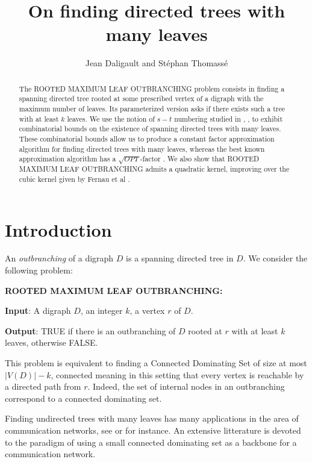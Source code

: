 \documentclass{article}
\title{On finding directed trees with many leaves}
\author{Jean Daligault and St\'ephan Thomass\'e}
\def\RMO{R{\footnotesize{OOTED}} M{\footnotesize{AXIMUM}} L{\footnotesize{EAF}} O{\footnotesize{UTBRANCHING}} }
\def\RMOC{R{\footnotesize{OOTED}} M{\footnotesize{AXIMUM}} L{\footnotesize{EAF}} O{\footnotesize{UTBRANCHING}}: }
\begin{document}
\maketitle

\begin{abstract}
The \RMO problem consists in finding a spanning directed tree rooted at some prescribed vertex of a 
digraph with the maximum number of leaves. Its parameterized version asks if there 
exists such a tree with at least $k$ leaves. We use the notion of $s-t$ numbering studied in \cite{stnum}, \cite{stnumdir}, \cite{LLWemb} to exhibit combinatorial bounds on the existence of spanning directed trees with many leaves. These combinatorial bounds allow us to produce a constant factor approximation algorithm for finding directed trees with many leaves, whereas the best known approximation algorithm has a $\sqrt{OPT}$-factor \cite{DrescherMaxLeaf}. We also show that \RMO admits a quadratic kernel, improving over the cubic kernel given by Fernau et al \cite{FernauMaxLeaf}.
\end{abstract}


\section{Introduction}
An \emph{outbranching} of a digraph $D$ is a spanning directed tree in $D$. 
We consider the following problem:

\vspace{12pt}
{\bf \RMOC}


\vspace{12pt}
\textbf{Input}: A digraph $D$, an integer $k$, a vertex $r$ of $D$.


\textbf{Output}: TRUE if there is an outbranching of $D$ rooted at $r$ with at least $k$ leaves, otherwise FALSE.
\vspace{12pt}

This problem is equivalent to finding a Connected Dominating Set of size at most $|V(D)|-k$, connected meaning in this setting that every vertex is reachable by a directed path from $r$. Indeed, the set of internal nodes in an outbranching correspond to a connected dominating set.

Finding undirected trees with many leaves has many applications in the area of communication networks, see \cite{MaxLeafApplication2} or \cite{MaxLeafApplication} for instance. An extensive litterature is devoted to the paradigm of using a small connected dominating set as a backbone for a communication network.
\end{document}
